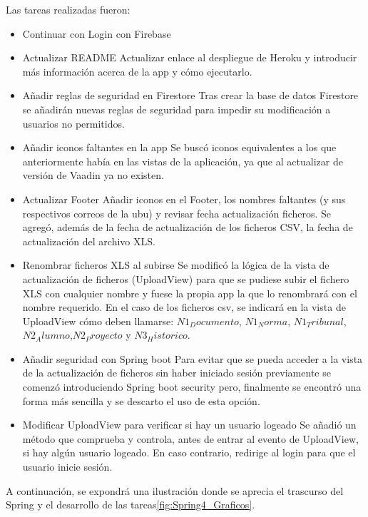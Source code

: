 Las tareas realizadas fueron:
\begin{itemize}
	\tightlist
	\item Continuar con Login con Firebase
	\item Actualizar README
	Actualizar enlace al despliegue de Heroku y introducir más información acerca de la app y cómo ejecutarlo.
	\item Añadir reglas de seguridad en Firestore
	Tras crear la base de datos Firestore se añadirán nuevas reglas de seguridad para impedir su modificación a usuarios no permitidos.
	\item Añadir iconos faltantes en la app
	Se buscó iconos equivalentes a los que anteriormente había en las vistas de la aplicación, ya que al actualizar de versión de Vaadin ya no existen.
	\item Actualizar Footer
	Añadir iconos en el Footer, los nombres faltantes (y sus respectivos correos de la ubu) y revisar fecha actualización ficheros. Se agregó, además de la fecha de actualización de los ficheros CSV, la fecha de actualización del archivo XLS.
	\item Renombrar ficheros XLS al subirse
	Se modificó la lógica de la vista de actualización de ficheros (UploadView) para que se pudiese subir el fichero XLS con cualquier nombre y fuese la propia app la que lo renombrará con el nombre requerido. En el caso de los ficheros csv, se indicará en la vista de UploadView cómo deben llamarse: $N1_Documento$, $N1_Norma$, $N1_Tribunal$,$N2_Alumno$,$N2_Proyecto$ y $N3_Historico$.
	\item Añadir seguridad con Spring boot
	Para evitar que se pueda acceder a la vista de la actualización de ficheros sin haber iniciado sesión previamente se comenzó introduciendo Spring boot security pero, finalmente se encontró una forma más sencilla y se descarto el uso de esta opción.
	\item Modificar UploadView para verificar si hay un usuario logeado
	Se añadió un método que comprueba y controla, antes de entrar al evento de UploadView, si hay algún usuario logeado. En caso contrario, redirige al login para que el usuario inicie sesión. 
	
\end{itemize}

A continuación, se expondrá una ilustración donde se aprecia el trascurso del Spring y el desarrollo de las tareas\ref{fig:Spring4_Graficos}.


